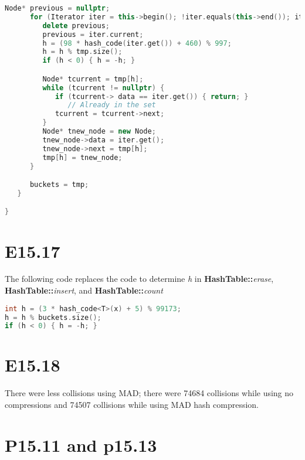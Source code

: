 \documentclass[letterpaper, 11pt]{article}
\begin{document}
\begin{lstlisting}[language=c++, caption=HashTable::insert]
      Node* previous = nullptr;
      for (Iterator iter = this->begin(); !iter.equals(this->end()); iter.next()) {
         delete previous;
         previous = iter.current;
         h = (98 * hash_code(iter.get()) + 460) % 997;
         h = h % tmp.size();
         if (h < 0) { h = -h; }

         Node* tcurrent = tmp[h];
         while (tcurrent != nullptr) {
            if (tcurrent-> data == iter.get()) { return; }
               // Already in the set
            tcurrent = tcurrent->next;
         }
         Node* tnew_node = new Node;
         tnew_node->data = iter.get();
         tnew_node->next = tmp[h];
         tmp[h] = tnew_node;
      }

      buckets = tmp;
   }

}
\end{lstlisting}

\section{E15.17}

The following code replaces the code to determine \textit{h} in \textbf{HashTable::}\textit{erase}, \textbf{HashTable::}\textit{insert}, and \textbf{HashTable::}\textit{count}

\begin{lstlisting}[language=c++, caption=h code]
int h = (3 * hash_code<T>(x) + 5) % 99173;
h = h % buckets.size();
if (h < 0) { h = -h; }
\end{lstlisting}

\section{E15.18}

There were less collisions using MAD; there were 74684 collisions while using no compressions and 74507 collisions while using MAD hash compression.

\section{P15.11 and p15.13}
\end{document}
